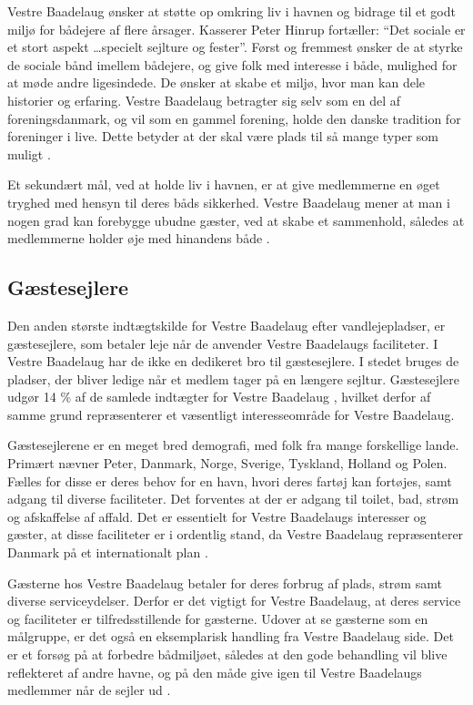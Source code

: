 Vestre Baadelaug ønsker at støtte op omkring liv i havnen og bidrage til et godt miljø for bådejere af flere årsager. Kasserer Peter Hinrup fortæller: \enquote{Det sociale er et stort aspekt \ldots specielt sejlture og fester}. Først og fremmest ønsker de at styrke de sociale bånd imellem bådejere, og give folk med interesse i både, mulighed for at møde andre ligesindede. De ønsker at skabe et miljø, hvor man kan dele historier og erfaring. Vestre Baadelaug betragter sig selv som en del af foreningsdanmark, og vil som en gammel forening, holde den danske tradition for foreninger i live. Dette betyder at der skal være plads til så mange typer som muligt \cite{int_vb_sl}.

Et sekundært mål, ved at holde liv i havnen, er at give medlemmerne en øget tryghed med hensyn til deres båds sikkerhed. Vestre Baadelaug mener at man i nogen grad kan forebygge ubudne gæster, ved at skabe et sammenhold, således at medlemmerne holder øje med hinandens både \cite{int_vb_sl}.


\subsection{Gæstesejlere}\label{sec:gaste}

Den anden største indtægtskilde for Vestre Baadelaug efter vandlejepladser, er gæstesejlere, som betaler leje når de anvender Vestre Baadelaugs faciliteter. I Vestre Baadelaug har de ikke en dedikeret bro til gæstesejlere. I stedet bruges de pladser, der bliver ledige når et medlem tager på en længere sejltur. Gæstesejlere udgør 14 \% af de samlede indtægter for Vestre Baadelaug \cite{vestre_arsregnskab}, hvilket derfor af samme grund repræsenterer et væsentligt interesseområde for Vestre Baadelaug.

Gæstesejlerene er en meget bred demografi, med folk fra mange forskellige lande. Primært nævner Peter, Danmark, Norge, Sverige, Tyskland, Holland og Polen. Fælles for disse er deres behov for en havn, hvori deres fartøj kan fortøjes, samt adgang til diverse faciliteter. Det forventes at der er adgang til toilet, bad, strøm og afskaffelse af affald. Det er essentielt for Vestre Baadelaugs interesser og gæster, at disse faciliteter er i ordentlig stand, da Vestre Baadelaug repræsenterer Danmark på et internationalt plan \cite{int_vb_sl}.

Gæsterne hos Vestre Baadelaug betaler for deres forbrug af plads, strøm samt diverse serviceydelser. Derfor er det vigtigt for Vestre Baadelaug, at deres service og faciliteter er tilfredsstillende for gæsterne. Udover at se gæsterne som en målgruppe, er det også en eksemplarisk handling fra Vestre Baadelaug side. Det er et forsøg på at forbedre bådmiljøet, således at den gode behandling vil blive reflekteret af andre havne, og på den måde give igen til Vestre Baadelaugs medlemmer når de sejler ud \cite{int_vb_sl}.


